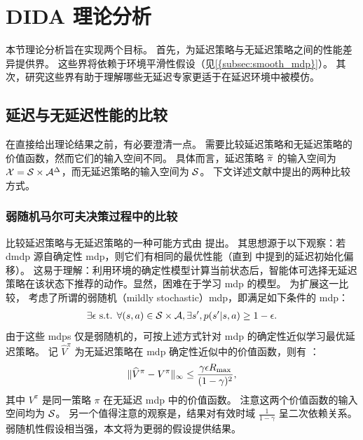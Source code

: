 \section{DIDA 理论分析}
\label{sec:th_analysis_imitation}

本节理论分析旨在实现两个目标。
首先，为延迟策略与无延迟策略之间的性能差异提供界。
这些界将依赖于环境平滑性假设（见\cref{{subsec:smooth_mdp}}）。
其次，研究这些界有助于理解哪些无延迟专家更适于在延迟环境中被模仿。


\subsection{延迟与无延迟性能的比较}
\label{subsec:compare_delayed_undelayed}

在直接给出理论结果之前，有必要澄清一点。
需要比较延迟策略和无延迟策略的价值函数，然而它们的输入空间不同。
具体而言，延迟策略 ${\widetilde{\pi}}$ 的输入空间为 $\mathcal{X}=\mathcal{S}\times\mathcal{A}^\Delta$，而无延迟策略的输入空间为 $\mathcal{S}$。
下文详述文献中提出的两种比较方式。

\subsubsection{弱随机马尔可夫决策过程中的比较}
比较延迟策略与无延迟策略的一种可能方式由 \cite{walsh2009learning} 提出。
其思想源于以下观察：若 \gls{dmdp} 源自确定性 \gls{mdp}，则它们有相同的最优性能（直到 中提到的延迟初始化偏移）。
这易于理解：利用环境的确定性模型计算当前状态后，智能体可选择无延迟策略在该状态下推荐的动作。显然，困难在于学习 \gls{mdp} 的模型。
为扩展这一比较，\cite{walsh2009learning} 考虑了所谓的弱随机（mildly stochastic）\gls{mdp}，即满足如下条件的 \gls{mdp}：
\begin{align*}
    \exists \epsilon \text{ s.t. } \forall (s,a)\in\mathcal{S}\times\mathcal{A}, \exists s', p(s'\vert s,a)\geq 1-\epsilon.
\end{align*}
由于这些 \glspl{mdp} 仅是弱随机的，可按上述方式针对 \gls{mdp} 的确定性近似学习最优延迟策略。
记 $\widehat{V}^{\pi}$ 为无延迟策略在 \gls{mdp} 确定性近似中的价值函数，则有 \cite[Theorem~3]{walsh2009learning}：
\begin{align*}
    \lVert \widehat{V}^{\pi}-{V}^{\pi}\rVert_{\infty}\leq \frac{\gamma\epsilon {R_{\max}}}{(1-\gamma)^2},
\end{align*}
其中 ${V}^{\pi}$ 是同一策略 $\pi$ 在无延迟 \gls{mdp} 中的价值函数。
注意这两个价值函数的输入空间均为 $\mathcal{S}$。
另一个值得注意的观察是，结果对有效时域 $\textstyle\frac{1}{1-\gamma}$ 呈二次依赖关系。
弱随机性假设相当强，本文将为更弱的假设提供结果。

